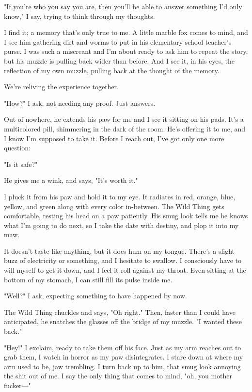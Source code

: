 "If you're who you say you are, then you'll be able to answer something I'd only know," I say, trying to think through my thoughts.

I find it; a memory that's only true to me. A little marble fox comes to mind, and I see him gathering dirt and worms to put in his elementary school teacher's purse. I was such a miscreant and I'm about ready to ask him to repeat the story, but his muzzle is pulling back wider than before. And I see it, in his eyes, the reflection of my own muzzle, pulling back at the thought of the memory.

We're reliving the experience together.

"How?" I ask, not needing any proof. Just answers.

Out of nowhere, he extends his paw for me and I see it sitting on his pads. It's a multicolored pill, shimmering in the dark of the room. He's offering it to me, and I know I'm supposed to take it. Before I reach out, I've got only one more question:

"Is it safe?"

He gives me a wink, and says, "It's worth it."

I pluck it from his paw and hold it to my eye. It radiates in red, orange, blue, yellow, and green along with every color in-between. The Wild Thing gets comfortable, resting his head on a paw patiently. His smug look tells me he knows what I'm going to do next, so I take the date with destiny, and plop it into my maw.

It doesn't taste like anything, but it does hum on my tongue. There's a slight buzz of electricity or something, and I hesitate to swallow. I consciously have to will myself to get it down, and I feel it roll against my throat. Even sitting at the bottom of my stomach, I can still fill its pulse inside me.

"Well?" I ask, expecting something to have happened by now.

The Wild Thing chuckles and says, "Oh right." Then, faster than I could have anticipated, he snatches the glasses off the bridge of my muzzle. "I wanted these back."

"Hey!" I exclaim, ready to take them off his face. Just as my arm reaches out to grab them, I watch in horror as my paw disintegrates. I stare down at where my arm used to be, jaw trembling. I turn back up to him, that smug look annoying the shit out of me. I say the only thing that comes to mind, "oh, you mother fucker---"

